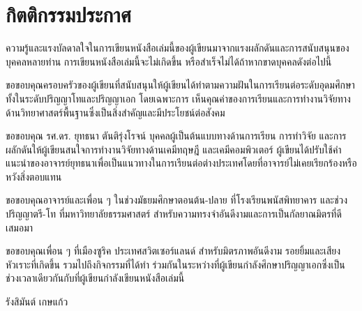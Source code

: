 

\chapter*{\centering กิตติกรรมประกาศ}

ความรู้และแรงบัลดาลใจในการเขียนหนังสือเล่มนี้ของผู้เขียนมาจากแรงผลักดันและการสนับสนุนของบุคคลหลายท่าน การเขียนหนังสือเล่มนี้จะไม่เกิดขึ้น%
หรือสำเร็จไม่ได้ถ้าหากขาดบุคคลดังต่อไปนี้

ขอขอบคุณครอบครัวของผู้เขียนที่สนับสนุนให้ผู้เขียนได้ทำตามความฝันในการเรียนต่อระดับอุดมศึกษา ทั้งในระดับปริญญาโทและปริญญาเอก โดยเฉพาะการ%
เห็นคุณค่าของการเรียนและการทำงานวิจัยทางด้านวิทยาศาสตร์พื้นฐานซึ่งเป็นสิ่งสำคัญและมีประโยชน์ต่อสังคม

ขอขอบคุณ รศ.ดร. ยุทธนา ตันติรุ่งโรจน์ บุคคลผู้เป็นต้นแบบทางด้านการเรียน การทำวิจัย และการผลักดันให้ผู้เขียนสนใจการทำงานวิจัยทางด้านเคมีทฤษฎี%
และเคมีคอมพิวเตอร์ ผู้เขียนได้ปรับใช้คำแนะนำของอาจารย์ยุทธนาเพื่อเป็นแนวทางในการเรียนต่อต่างประเทศโดยที่อาจารย์ไม่เคยเรียกร้องหรือหวังสิ่งตอบแทน

ขอขอบคุณอาจารย์และเพื่อน ๆ ในช่วงมัธยมศึกษาตอนต้น-ปลาย ที่โรงเรียนพนัสพิทยาคาร และช่วงปริญญาตรี-โท ที่มหาวิทยาลัยธรรมศาสตร์ 
สำหรับความทรงจำอันดีงามและการเป็นกัลยาณมิตรที่ดีเสมอมา

ขอขอบคุณเพื่อน ๆ ที่เมืองซูริค ประเทศสวิตเซอร์แลนด์ สำหรับมิตรภาพอันดีงาม รอยยิ้มและเสียงหัวเราะที่เกิดขึ้น รวมไปถึงกิจกรรมที่ได้ทำ%
ร่วมกันในระหว่างที่ผู้เขียนกำลังศึกษาปริญญาเอกซึ่งเป็นช่วงเวลาเดียวกันกับที่ผู้เขียนกำลังเขียนหนังสือเล่มนี้

\medskip

\begin{flushright}
รังสิมันต์ เกษแก้ว
\end{flushright}
